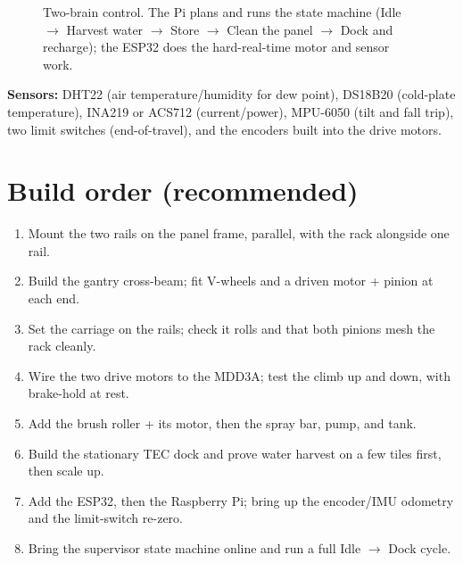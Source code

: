 \documentclass[11pt,a4paper]{article}
\begin{document}
\begin{figure}[h]
\centering
{}
\caption{Two-brain control. The Pi plans and runs the state machine (Idle $\to$ Harvest water $\to$ Store
$\to$ Clean the panel $\to$ Dock and recharge); the ESP32 does the hard-real-time motor and sensor work.}
\end{figure}

\noindent\textbf{Sensors:} DHT22 (air temperature/humidity for dew point), DS18B20 (cold-plate
temperature), INA219 or ACS712 (current/power), MPU-6050 (tilt and fall trip), two limit switches
(end-of-travel), and the encoders built into the drive motors.

\section{Build order (recommended)}

\begin{enumerate}[leftmargin=*,itemsep=2pt]
  \item Mount the two rails on the panel frame, parallel, with the rack alongside one rail.
  \item Build the gantry cross-beam; fit V-wheels and a driven motor + pinion at each end.
  \item Set the carriage on the rails; check it rolls and that both pinions mesh the rack cleanly.
  \item Wire the two drive motors to the MDD3A; test the climb up and down, with brake-hold at rest.
  \item Add the brush roller + its motor, then the spray bar, pump, and tank.
  \item Build the stationary TEC dock and prove water harvest on a few tiles first, then scale up.
  \item Add the ESP32, then the Raspberry Pi; bring up the encoder/IMU odometry and the limit-switch
  re-zero.
  \item Bring the supervisor state machine online and run a full Idle $\to$ Dock cycle.
\end{enumerate}
\end{document}
